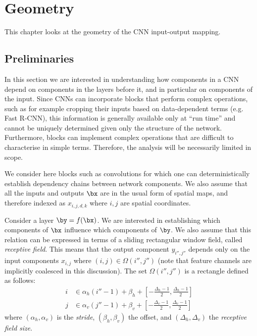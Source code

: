 \chapter{Geometry}\label{s:geometry}

This chapter looks at the geometry of the CNN input-output mapping.

\section{Preliminaries}\label{s:preliminaries}

In this section we are interested in understanding how components in a CNN depend on components in the layers before it, and in particular on components of the input.  Since CNNs can incorporate blocks that perform complex operations, such as for example cropping their inputs based on data-dependent terms (e.g. Fast R-CNN), this information is generally available only at ``run time'' and cannot be uniquely determined given only the structure of the network. Furthermore, blocks can implement complex operations that are difficult to characterise in simple terms. Therefore, the analysis will be necessarily limited in scope.

We consider here blocks such as convolutions for which one can deterministically establish dependency chains between network components. We also assume that all the inputs and outputs $\bx$ are in the usual form of spatial maps, and therefore indexed as $x_{i,j,d,k}$ where $i,j$ are spatial coordinates.

Consider a layer $\by = f(\bx)$. We are interested in establishing which components of $\bx$ influence which components of $\by$. We also assume that this relation can be expressed in terms of a sliding rectangular window field, called \emph{receptive field}. This means that the output component  $y_{i'', j''}$ depends only on the input components $x_{i,j}$ where $(i,j) \in \Omega(i'', j'') $ (note that feature channels are implicitly coalesced in this discussion). The set $\Omega(i'',j'')$ is a rectangle defined as follows:
\begin{align}\label{e:receptive}
     i &\in \alpha_h (i'' -1) + \beta_h + [- \frac{\Delta_h-1}{2}, \frac{\Delta_h-1}{2}] \\
     j &\in \alpha_v (j'' -1) + \beta_v + [- \frac{\Delta_v-1}{2}, \frac{\Delta_v-1}{2}]
\end{align}
where $(\alpha_h,\alpha_v)$ is the \emph{stride}, $(\beta_h,\beta_v)$ the offset, and $(\Delta_h, \Delta_v)$ the \emph{receptive field size}.

